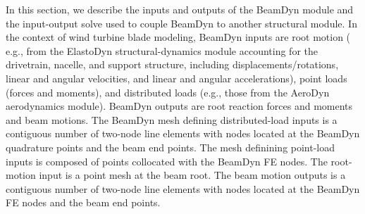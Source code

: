 \documentclass{aiaa-tc}
\newcommand{\mas}[1]{\textcolor{magenta}{#1}}
\begin{document}
In this section, we describe the inputs and outputs of the BeamDyn module  and the input-output solve used to couple BeamDyn to another structural module.  In the context of wind turbine blade modeling, 
BeamDyn inputs are root motion ( e.g., from the ElastoDyn structural-dynamics module accounting for the drivetrain, nacelle, and support structure, including displacements/rotations, linear and angular velocities, and linear and angular accelerations), point loads (forces and moments), and distributed loads (e.g., those from the AeroDyn aerodynamics module). BeamDyn outputs are root reaction forces and moments and beam motions. 
The BeamDyn mesh defining distributed-load inputs is a contiguous number of two-node line elements with nodes located at the BeamDyn quadrature points and the beam end points.  The mesh definining point-load inputs is composed of points collocated with the BeamDyn FE nodes.  The root-motion input is a point mesh at the beam root. The beam motion outputs is a contiguous number of two-node line elements with nodes located at the BeamDyn FE nodes and the beam end points. 

\end{document}
